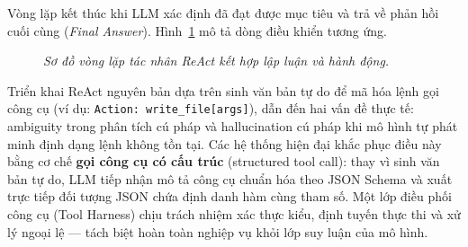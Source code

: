 Vòng lặp kết thúc khi LLM xác định đã đạt được mục tiêu và trả về phản hồi cuối cùng (\emph{Final Answer}). Hình~\ref{fig:agent-react-loop} mô tả dòng điều khiển tương ứng.

\begin{figure}[H]
  \centering
  \caption{\emph{Sơ đồ vòng lặp tác nhân ReAct kết hợp lập luận và hành động.}}
  \label{fig:agent-react-loop}
\end{figure}

Triển khai ReAct nguyên bản dựa trên sinh văn bản tự do để mã hóa lệnh gọi công cụ (ví dụ: \texttt{Action: write\_file[args]}), dẫn đến hai vấn đề thực tế: ambiguity trong phân tích cú pháp và hallucination cú pháp khi mô hình tự phát minh định dạng lệnh không tồn tại. Các hệ thống hiện đại khắc phục điều này bằng cơ chế \textbf{gọi công cụ có cấu trúc} (structured tool call): thay vì sinh văn bản tự do, LLM tiếp nhận mô tả công cụ chuẩn hóa theo JSON Schema và xuất trực tiếp đối tượng JSON chứa định danh hàm cùng tham số. Một lớp điều phối công cụ (Tool Harness) chịu trách nhiệm xác thực kiểu, định tuyến thực thi và xử lý ngoại lệ — tách biệt hoàn toàn nghiệp vụ khỏi lớp suy luận của mô hình.


